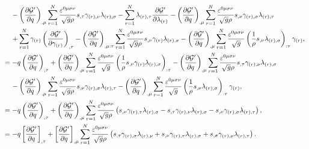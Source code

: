 \documentclass{article}
\numberwithin{equation}{section}
\begin{document}
\begin{appendices}
\begin{enumerate}[leftmargin=*]
\begin{align}
&\quad\, - \left(\frac{\partial{\cal G}'}{\partial q}\right)_{,\mu}\sum_{r=1}^N \frac{\varepsilon^{0\mu\sigma\nu}}{\sqrt{g}\rho} s_{,\tau}\gamma_{(r),\nu} \lambda_{(r),\sigma} - \sum_{r=1}^N \lambda_{(r),\tau}\frac{\partial{\cal G}'}{\partial \lambda_{(r)}} - \left(\frac{\partial{\cal G}'}{\partial q}\right)_{,\mu} \sum_{r=1}^N \frac{\varepsilon^{0\mu\sigma\nu}}{\sqrt{g}\rho} s_{,\nu}\gamma_{(r),\sigma} \lambda_{(r),\tau} \nonumber \\
&\quad\, + \sum_{r=1}^N \gamma_{(r)} \left(\frac{\partial{\cal G}'}{\partial \gamma_{(r)}}\right)_{,\tau} - \left(\frac{\partial{\cal G}'}{\partial q}\right)_{,\mu:\tau} \sum_{r=1}^N \frac{\varepsilon^{0\mu\sigma\nu}}{\sqrt{g}\rho} s_{,\nu} \gamma_{(r)}\lambda_{(r),\sigma} - \left(\frac{\partial{\cal G}'}{\partial q}\right)_{,\mu} \sum_{r=1}^N \frac{\varepsilon^{0\mu\sigma\nu}}{\sqrt{g}} \left(\frac{1}{\rho}s_{,\nu} \lambda_{(r),\sigma}\right)_{:\tau} \gamma_{(r)}, \nonumber \\
&=-q\left( \frac{\partial{\cal G}'}{\partial q} \right)_{,\tau} 
+\left(\frac{\partial{\cal G}'}{\partial q}\right)_{,\mu} \sum_{r=1}^N \frac{\varepsilon^{0\mu\sigma\nu}}{\sqrt{g}} \left(\frac{1}{\rho}s_{,\nu} \gamma_{(r)}\lambda_{(r),\sigma}\right)_{:\tau} - \left(\frac{\partial{\cal G}'}{\partial q}\right)_{,\mu}\sum_{r=1}^N \frac{\varepsilon^{0\mu\sigma\nu}}{\sqrt{g}\rho} s_{,\tau}\gamma_{(r),\nu} \lambda_{(r),\sigma} \nonumber \\
&\quad\, - \left(\frac{\partial{\cal G}'}{\partial q}\right)_{,\mu} \sum_{r=1}^N \frac{\varepsilon^{0\mu\sigma\nu}}{\sqrt{g}\rho} s_{,\nu}\gamma_{(r),\sigma} \lambda_{(r),\tau}
- \left(\frac{\partial{\cal G}'}{\partial q}\right)_{,\mu} \sum_{r=1}^N \frac{\varepsilon^{0\mu\sigma\nu}}{\sqrt{g}} \left(\frac{1}{\rho}s_{,\nu} \lambda_{(r),\sigma}\right)_{:\tau} \gamma_{(r)}, \nonumber \\
&=-q\left( \frac{\partial{\cal G}'}{\partial q} \right)_{,\tau}+\left(\frac{\partial{\cal G}'}{\partial q}\right)_{,\mu} \sum_{r=1}^N \frac{\varepsilon^{0\mu\sigma\nu}}{\sqrt{g}\rho} \left( s_{,\nu} \gamma_{(r),\tau}\lambda_{(r),\sigma} - s_{,\tau}\gamma_{(r),\nu} \lambda_{(r),\sigma} - s_{,\nu}\gamma_{(r),\sigma} \lambda_{(r),\tau} \right), \nonumber \\
&=-q\left[ \frac{\partial{\cal G}'}{\partial q} \right]_{,\tau}+\left[\frac{\partial{\cal G}'}{\partial q}\right]_{,\mu} \sum_{r=1}^N \frac{\varepsilon^{0\mu\sigma\nu}}{\sqrt{g}\rho} \left( s_{,\tau}\gamma_{(r),\sigma} \lambda_{(r),\nu} + s_{,\nu} \gamma_{(r),\tau}\lambda_{(r),\sigma} + s_{,\sigma}\gamma_{(r),\nu} \lambda_{(r),\tau} \right).

\end{align}
\end{enumerate}
\end{appendices}
\end{document}
